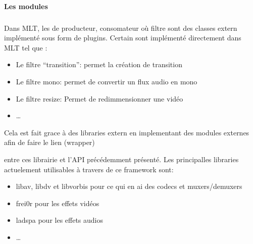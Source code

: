 \paragraph{Les modules}

\subparagraph{}

Dans MLT, les de producteur, consomateur où filtre sont des classes
extern implémenté sous form de plugins. Certain sont implémenté
directement dans MLT tel que :

\begin{itemize}

  \item {Le filtre ``transition'': permet la création de transition}

  \item {Le filtre mono: permet de convertir un flux audio en mono}

  \item {Le filtre resize: Permet de redimmensionner une vidéo}

  \item {\ldots}

\end{itemize}

Cela est fait grace à des libraries extern en implementant des modules
externes afin de faire le lien (wrapper)


entre ces librairie et l'API précédemment présenté. Les
principalles libraries actuelement utilisables à travers de ce framework
sont:

\begin{itemize}

  \item {libav, libdv et libvorbis pour ce qui en ai des codecs et
  muxers/demuxers}

  \item {frei0r pour les effets vidéos}

  \item {ladspa pour les effets audios}

  \item {\ldots}

\end{itemize}

\subparagraph{}


